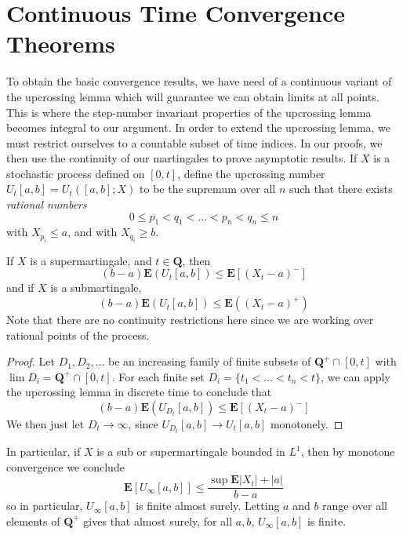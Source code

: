 \section{Continuous Time Convergence Theorems}

To obtain the basic convergence results, we have need of a continuous variant of the upcrossing lemma which will guarantee we can obtain limits at all points. This is where the step-number invariant properties of the upcrossing lemma becomes integral to our argument. In order to extend the upcrossing lemma, we must restrict ourselves to a countable subset of time indices. In our proofs, we then use the continuity of our martingales to prove asymptotic results. If $X$ is a stochastic process defined on $[0,t]$, define the upcrossing number $U_t[a,b] = U_t([a,b];X)$ to be the supremum over all $n$ such that there exists {\it rational numbers}
%
\[ 0 \leq p_1 < q_1 < \dots < p_n < q_n \leq n \]
%
with $X_{p_i} \leq a$, and with $X_{q_i} \geq b$.

\begin{lemma}
    If $X$ is a supermartingale, and $t \in \mathbf{Q}$, then
    \[ (b - a) \mathbf{E}(U_t[a,b]) \leq \mathbf{E}[(X_t - a)^-] \]
    and if $X$ is a submartingale,
    \[ (b - a) \mathbf{E}(U_t[a,b]) \leq \mathbf{E}((X_t - a)^+) \]
    Note that there are no continuity restrictions here since we are working over rational points of the process.
\end{lemma}
\begin{proof}
    Let $D_1, D_2, \dots$ be an increasing family of finite subsets of $\mathbf{Q}^+ \cap [0,t]$ with $\lim D_i = \mathbf{Q}^+ \cap [0,t]$. For each finite set $D_i = \{ t_1 < \dots < t_n < t \}$, we can apply the upcrossing lemma in discrete time to conclude that
    \[ (b-a) \mathbf{E}(U_{D_t}[a,b]) \leq \mathbf{E}[(X_t - a)^-] \]
    We then just let $D_t \to \infty$, since $U_{D_t}[a,b] \to U_t[a,b]$ monotonely.
\end{proof}

In particular, if $X$ is a sub or supermartingale bounded in $L^1$, then by monotone convergence we conclude
%
\[ \mathbf{E}[U_\infty[a,b]] \leq \frac{\sup \mathbf{E}|X_t| + |a|}{b - a} \]
%
so in particular, $U_\infty[a,b]$ is finite almost surely. Letting $a$ and $b$ range over all elements of $\mathbf{Q}^+$ gives that almost surely, for all $a,b$, $U_\infty[a,b]$ is finite.

